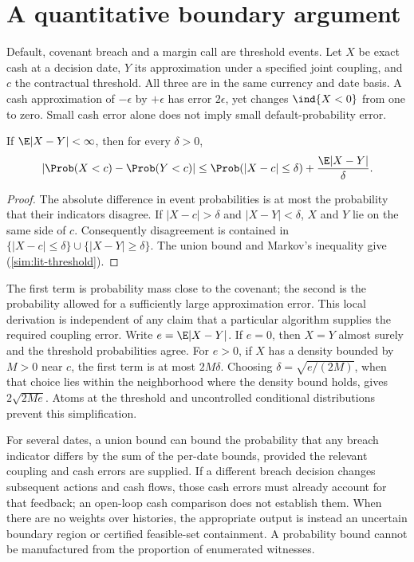


\section{A quantitative boundary argument}
Default, covenant breach and a margin call are threshold events. Let $X$ be
exact cash at a decision date, $Y$ its approximation under a specified joint
coupling, and $c$ the contractual threshold. All three are in the same currency
and date basis. A cash approximation of $-\epsilon$ by $+\epsilon$ has error
$2\epsilon$, yet changes $\ind\{X<0\}$ from one to zero. Small cash error
alone does not imply small default-probability error.

\begin{proposition}
If $\E|X-Y|<\infty$, then for every $\delta>0$,
\begin{equation}\label{sim:lit-threshold}
|\Prob(X<c)-\Prob(Y<c)|
\leq \Prob(|X-c|\leq\delta)+\frac{\E|X-Y|}{\delta}.
\end{equation}
\end{proposition}
\begin{proof}
The absolute difference in event probabilities is at most the probability
that their indicators disagree. If $|X-c|>\delta$ and $|X-Y|<\delta$, $X$
and $Y$ lie on the same side of $c$. Consequently disagreement is contained
in $\{|X-c|\leq\delta\}\cup\{|X-Y|\geq\delta\}$. The union bound
and Markov's inequality give (\ref{sim:lit-threshold}).
\end{proof}
The first term is probability mass close to the covenant; the second is the
probability allowed for a sufficiently large approximation error. This local
derivation is independent of any claim that a particular algorithm supplies
the required coupling error. Write $e=\E|X-Y|$. If $e=0$, then $X=Y$ almost surely and the threshold probabilities agree.
For $e>0$, if $X$ has a density bounded by $M>0$ near $c$,
the first term is at most $2M\delta$. Choosing
$\delta=\sqrt{e/(2M)}$, when that choice lies within the neighborhood where
the density bound holds, gives $2\sqrt{2Me}$. Atoms at the threshold and
uncontrolled conditional distributions prevent this simplification.

For several dates, a union bound can bound the probability that any breach
indicator differs by the sum of the per-date bounds, provided the relevant
coupling and cash errors are supplied. If a different breach decision changes
subsequent actions and cash flows, those cash errors must already account for
that feedback; an open-loop cash comparison does not establish them. When
there are no weights over histories, the appropriate output is instead an
uncertain boundary region or certified feasible-set containment. A probability
bound cannot be manufactured from the proportion of enumerated witnesses.

